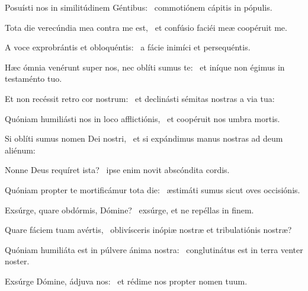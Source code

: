 \item Posuísti nos in similitúdinem Géntibus:~\psstar{} commotiónem cápitis in pópulis.

\item Tota die verecúndia mea contra me est,~\psstar{} et confúsio faciéi meæ coopéruit me.

\item A voce exprobrántis et obloquéntis:~\psstar{} a fácie inimíci et persequéntis.

\item Hæc ómnia venérunt super nos, nec oblíti sumus te:~\psstar{} et iníque non égimus in testaménto tuo.

\item Et non recéssit retro cor nostrum:~\psstar{} et declinásti sémitas nostras a via tua:

\item Quóniam humiliásti nos in loco afflictiónis,~\psstar{} et coopéruit nos umbra mortis.

\item Si oblíti sumus nomen Dei nostri,~\psstar{} et si expándimus manus nostras ad deum aliénum:

\item Nonne Deus requíret ista?~\psstar{} ipse enim novit abscóndita cordis.

\item Quóniam propter te mortificámur tota die:~\psstar{} æstimáti sumus sicut oves occisiónis.

\item Exsúrge, quare obdórmis, Dómine?~\psstar{} exsúrge, et ne repéllas in finem.

\item Quare fáciem tuam avértis,~\psstar{} oblivísceris inópiæ nostræ et tribulatiónis nostræ?

\item Quóniam humiliáta est in púlvere ánima nostra:~\psstar{} conglutinátus est in terra venter noster.

\item Exsúrge Dómine, ádjuva nos:~\psstar{} et rédime nos propter nomen tuum.